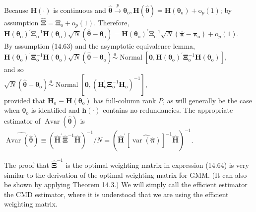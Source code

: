 \documentclass[10pt]{article}
\begin{document}
Because $\mathbf{H}(\cdot)$ is continuous and $\hat{\boldsymbol{\theta}} \xrightarrow{p} \boldsymbol{\theta}_{\mathrm{o}}, \mathbf{H}(\hat{\boldsymbol{\theta}})=\mathbf{H}\left(\boldsymbol{\theta}_{\mathrm{o}}\right)+\mathrm{o}_{p}(1)$; by assumption $\hat{\boldsymbol{\Xi}}= \boldsymbol{\Xi}_{\mathrm{o}}+\mathrm{o}_{p}(1)$. Therefore,\\
$\mathbf{H}\left(\boldsymbol{\theta}_{\mathrm{o}}\right)^{\prime} \boldsymbol{\Xi}_{\mathrm{o}}^{-1} \mathbf{H}\left(\boldsymbol{\theta}_{\mathrm{o}}\right) \sqrt{N}\left(\hat{\boldsymbol{\theta}}-\boldsymbol{\theta}_{\mathrm{o}}\right)=\mathbf{H}\left(\boldsymbol{\theta}_{\mathrm{o}}\right)^{\prime} \boldsymbol{\Xi}_{\mathrm{o}}^{-1} \sqrt{N}\left(\hat{\boldsymbol{\pi}}-\boldsymbol{\pi}_{\mathrm{o}}\right)+\mathrm{o}_{p}(1)$.\\
By assumption (14.63) and the asymptotic equivalence lemma,\\
$\mathbf{H}\left(\boldsymbol{\theta}_{\mathrm{o}}\right)^{\prime} \boldsymbol{\Xi}_{\mathrm{o}}^{-1} \mathbf{H}\left(\boldsymbol{\theta}_{\mathrm{o}}\right) \sqrt{N}\left(\hat{\boldsymbol{\theta}}-\boldsymbol{\theta}_{\mathrm{o}}\right) \stackrel{a}{\sim} \operatorname{Normal}\left[\mathbf{0}, \mathbf{H}\left(\boldsymbol{\theta}_{\mathrm{o}}\right)^{\prime} \boldsymbol{\Xi}_{\mathrm{o}}^{-1} \mathbf{H}\left(\boldsymbol{\theta}_{\mathrm{o}}\right)\right]$,\\
and so\\
$\sqrt{N}\left(\hat{\boldsymbol{\theta}}-\boldsymbol{\theta}_{\mathrm{o}}\right) \stackrel{a}{\sim} \operatorname{Normal}\left[\mathbf{0},\left(\mathbf{H}_{\mathrm{o}}^{\prime} \boldsymbol{\Xi}_{\mathrm{o}}^{-1} \mathbf{H}_{\mathrm{o}}\right)^{-1}\right]$,\\
provided that $\mathbf{H}_{\mathrm{o}} \equiv \mathbf{H}\left(\boldsymbol{\theta}_{\mathrm{o}}\right)$ has full-column rank $P$, as will generally be the case when $\boldsymbol{\theta}_{\mathrm{o}}$ is identified and $\mathbf{h}(\cdot)$ contains no redundancies. The appropriate estimator of $\operatorname{Avar}(\hat{\boldsymbol{\theta}})$ is\\
$\widehat{\operatorname{Avar}(\hat{\boldsymbol{\theta}})} \equiv\left(\hat{\mathbf{H}}^{\prime} \hat{\boldsymbol{\Xi}}^{-1} \hat{\mathbf{H}}\right)^{-1} / N=\left(\hat{\mathbf{H}}^{\prime}[\widehat{\operatorname{var}(\hat{\boldsymbol{\pi}})}]^{-1} \hat{\mathbf{H}}\right)^{-1}$.

The proof that $\hat{\boldsymbol{\Xi}}^{-1}$ is the optimal weighting matrix in expression (14.64) is very similar to the derivation of the optimal weighting matrix for GMM. (It can also be shown by applying Theorem 14.3.) We will simply call the efficient estimator the CMD estimator, where it is understood that we are using the efficient weighting matrix.
\end{document}

